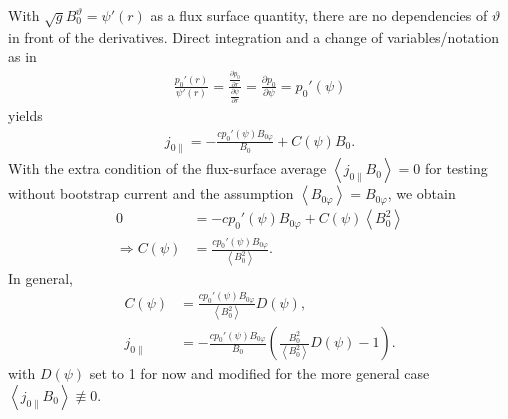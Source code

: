 \documentclass[a4paper, 10pt, english]{article}
\let\temp\vartheta
\let\vartheta\theta
\let\theta\temp
\let\temp\varphi
\let\varphi\phi
\let\phi\temp
\newcommand*\pd[2][]{\ensuremath{\frac{\partial #1}{\partial #2}}}  %
\begin{document}
With $\sqrt{g} B_{0}^{\theta} = \psi'(r)$ as a flux surface quantity, there are no dependencies of $\theta$ in front of the derivatives. Direct integration and a change of variables/notation as in
\begin{gather}
  \frac{p_{0}'(r)}{\psi'(r)} = \frac{\pd[p_{0}]{r}}{\pd[\psi]{r}} = \pd[p_{0}]{\psi} = p_{0}'(\psi)
\end{gather}
yields
\begin{gather}
  j_{0 \parallel} = -\frac{c p_{0}'(\psi) B_{0 \phi}}{B_{0}} + C(\psi) B_{0}.
\end{gather}
With the extra condition of the flux-surface average $\left\langle j_{0 \parallel} B_{0} \right\rangle = 0$ for testing without bootstrap current and the assumption $\left\langle B_{0 \phi} \right\rangle = B_{0 \phi}$, we obtain
\begin{align}
  0 &= -c p_{0}'(\psi) B_{0 \phi} + C(\psi) \left\langle B_{0}^{2} \right\rangle \nonumber \\
  \Rightarrow C(\psi) &= \frac{c p_{0}'(\psi) B_{0 \phi}}{\left\langle B_{0}^{2} \right\rangle}.
\end{align}
In general, 
\begin{align}
  C(\psi) &= \frac{c p_{0}'(\psi) B_{0 \phi}}{\left\langle B_{0}^{2} \right\rangle} D(\psi), \\
  j_{0 \parallel} &= -\frac{c p_{0}'(\psi) B_{0 \phi}}{B_{0}} \left( \frac{B_{0}^{2}}{\left\langle B_{0}^{2} \right\rangle} D(\psi) - 1 \right).
\end{align}
with $D(\psi)$ set to 1 for now and modified for the more general case $\left\langle j_{0 \parallel} B_{0} \right\rangle \not\equiv 0$.
\end{document}
